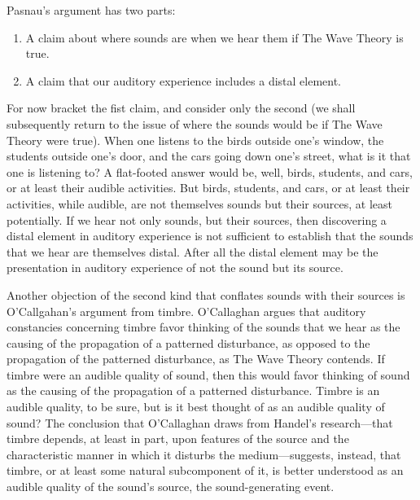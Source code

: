 \documentclass[12pt]{article}
\begin{document}
Pasnau's argument has two parts:
\begin{enumerate}
	\item A claim about where sounds are when we hear them if The Wave Theory is true.
	\item A claim that our auditory experience includes a distal element.
\end{enumerate}
For now bracket the fist claim, and consider only the second (we shall subsequently return to the issue of where the sounds would be if The Wave Theory were true). When one listens to the birds outside one’s window, the students outside one’s door, and the cars going down one’s street, what is it that one is listening to? A flat-footed answer would be, well, birds, students, and cars, or at least their audible activities. But birds, students, and cars, or at least their activities, while audible, are not themselves sounds but their sources, at least potentially. If we hear not only sounds, but their sources, then discovering a distal element in auditory experience is not sufficient to establish that the sounds that we hear are themselves distal. After all the distal element may be the presentation in auditory experience of not the sound but its source.

Another objection of the second kind that conflates sounds with their sources is O’Callgahan’s \citeyearpar[89]{OCallaghan:2007xy} argument from timbre. O’Callaghan argues that auditory constancies concerning timbre favor thinking of the sounds that we hear as the causing of the propagation of a patterned disturbance, as opposed to the propagation of the patterned disturbance, as The Wave Theory contends. If timbre were an audible quality of sound, then this would favor thinking of sound as the causing of the propagation of a patterned disturbance. Timbre is an audible quality, to be sure, but is it best thought of as an audible quality of sound? The conclusion that O’Callaghan draws from Handel’s \citeyearpar{Handel:1995aa} research---that timbre depends, at least in part, upon features of the source and the characteristic manner in which it disturbs the medium---suggests, instead, that timbre, or at least some natural subcomponent of it, is better understood as an audible quality of the sound’s source, the sound-generating event.
\end{document}
